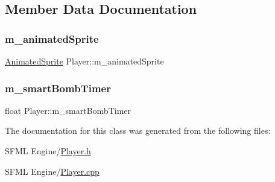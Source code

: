 \subsection{Member Data Documentation}
\mbox{\label{class_player_a6d6dfb4b46e5aa9eac78fd8cced73825}} 
\subsubsection{\texorpdfstring{m\+\_\+animated\+Sprite}{m\_animatedSprite}}
{\footnotesize\ttfamily \hyperlink{class_animated_sprite}{Animated\+Sprite} Player\+::m\+\_\+animated\+Sprite}

\mbox{\label{class_player_adb6552419db92fdbc9aeda36e807c6ec}} 
\subsubsection{\texorpdfstring{m\+\_\+smart\+Bomb\+Timer}{m\_smartBombTimer}}
{\footnotesize\ttfamily float Player\+::m\+\_\+smart\+Bomb\+Timer}



The documentation for this class was generated from the following files\+:\begin{DoxyCompactItemize}
\item 
S\+F\+M\+L Engine/\hyperlink{_player_8h}{Player.\+h}\item 
S\+F\+M\+L Engine/\hyperlink{_player_8cpp}{Player.\+cpp}\end{DoxyCompactItemize}
